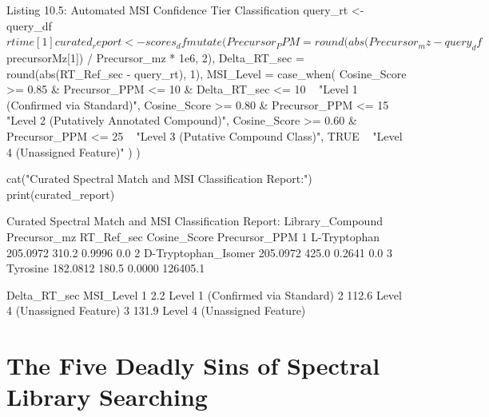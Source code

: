\documentclass[11pt,twoside,openright]{book}
\begin{document}
\begin{rchunk}{Listing 10.5: Automated MSI Confidence Tier Classification}
query_rt <- query_df$rtime[1]

curated_report <- scores_df %
  mutate(
    Precursor_PPM = round(abs(Precursor_mz - query_df$precursorMz[1]) / Precursor_mz * 1e6, 2),
    Delta_RT_sec  = round(abs(RT_Ref_sec - query_rt), 1),
    MSI_Level     = case_when(
      Cosine_Score >= 0.85 & Precursor_PPM <= 10 & Delta_RT_sec <= 10 ~ "Level 1 (Confirmed via Standard)",
      Cosine_Score >= 0.80 & Precursor_PPM <= 15                      ~ "Level 2 (Putatively Annotated Compound)",
      Cosine_Score >= 0.60 & Precursor_PPM <= 25                      ~ "Level 3 (Putative Compound Class)",
      TRUE                                                            ~ "Level 4 (Unassigned Feature)"
    )
  )

cat("Curated Spectral Match and MSI Classification Report:\n")
print(curated_report)
\end{rchunk}

\begin{routput}
Curated Spectral Match and MSI Classification Report:
     Library\_Compound Precursor\_mz RT\_Ref\_sec Cosine\_Score Precursor\_PPM
1        L-Tryptophan     205.0972      310.2       0.9996           0.0
2 D-Tryptophan\_Isomer     205.0972      425.0       0.2641           0.0
3            Tyrosine     182.0812      180.5       0.0000      126405.1

  Delta\_RT\_sec                        MSI\_Level
1          2.2 Level 1 (Confirmed via Standard)
2        112.6     Level 4 (Unassigned Feature)
3        131.9     Level 4 (Unassigned Feature)
\end{routput}

\section{The Five Deadly Sins of Spectral Library Searching}
\end{document}

